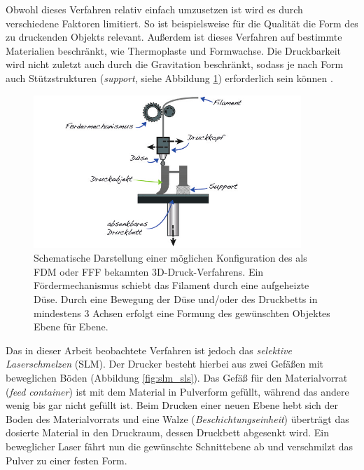 		Obwohl dieses Verfahren relativ einfach umzusetzen ist wird es durch verschiedene Faktoren
		limitiert. So ist beispielsweise für die Qualität die Form des zu druckenden Objekts
		relevant. Außerdem ist dieses Verfahren auf bestimmte Materialien beschränkt, wie
		Thermoplaste und Formwachse. Die Druckbarkeit wird nicht zuletzt auch durch die
		Gravitation beschränkt, sodass je nach Form auch Stützstrukturen (\emph{support}, siehe
		Abbildung \ref{fig:fdm}) erforderlich sein können \cite{wikipedia2021fused}.

		\begin{figure}[ht]
			\centering
			\includegraphics[width=0.9\textwidth]{chapter/main/img/fdm.png}
			\caption[Schematische Darstellung des FDM-/FFF-Verfahrens]{Schematische Darstellung
			einer möglichen Konfiguration des als FDM oder FFF bekannten 3D-Druck-Verfahrens. Ein
			Fördermechanismus schiebt das Filament durch eine aufgeheizte Düse. Durch eine
			Bewegung der Düse und/oder des Druckbetts in mindestens 3 Achsen erfolgt eine Formung
			des gewünschten Objektes Ebene für Ebene. \cite[S. 114]{horsch20143d}}
			\label{fig:fdm}
		\end{figure}

		Das in dieser Arbeit beobachtete Verfahren ist jedoch das \emph{selektive Laserschmelzen}
		(SLM). Der Drucker besteht hierbei aus zwei Gefäßen mit beweglichen Böden (Abbildung
		\ref{fig:slm_sls}). Das Gefäß für den Materialvorrat (\emph{feed container}) ist mit dem
		Material in Pulverform gefüllt, während das andere wenig bis gar nicht gefüllt ist. Beim
		Drucken einer neuen Ebene hebt sich der Boden des Materialvorrats und eine Walze
		(\emph{Beschichtungseinheit}) überträgt das dosierte Material in den Druckraum, dessen
		Druckbett abgesenkt wird. Ein beweglicher Laser fährt nun die gewünschte Schnittebene ab
		und verschmilzt das Pulver zu einer festen Form.

